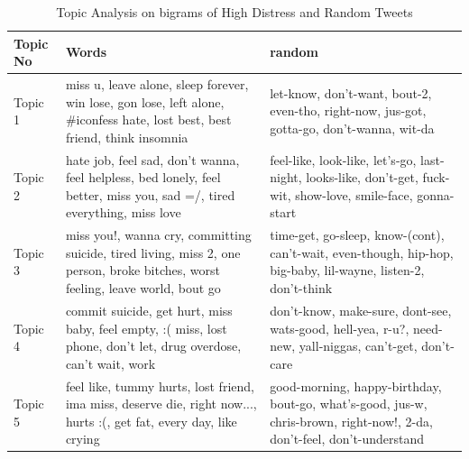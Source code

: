 \documentclass[11pt]{article}
\begin{document}
\begin{table}[h]
    \centering
    \tiny 
    \begin{tabular}{|p{0.5cm}|p{3cm}|p{3cm}|}
    \hline
    \textbf{Topic No } & \textbf{Words} & \textbf {random}  \\ \hline
    \vfill \vfill Topic 1 & miss u, leave alone, sleep forever, win lose, gon lose, left alone, \#iconfess hate, lost best, best friend, think insomnia & let-know, don't-want, bout-2, even-tho, right-now, jus-got, gotta-go, don't-wanna, wit-da\\ \hline
    \vfill \vfill Topic 2 & hate job, feel sad, don't wanna, feel helpless, bed lonely, feel better, miss you, sad =/, tired everything, miss love &  feel-like, look-like, let's-go, last-night, looks-like, don't-get, fuck-wit, show-love, smile-face, gonna-start \\ \hline
    \vfill \vfill Topic 3 & miss you!, wanna cry, committing suicide, tired living, miss 2, one person, broke bitches, worst feeling, leave world, bout go & time-get, go-sleep, know-(cont), can't-wait, even-though, hip-hop, big-baby, lil-wayne, listen-2, don't-think \\ \hline
    \vfill \vfill Topic 4 & commit suicide, get hurt, miss baby, feel empty, :( miss, lost phone, don't let, drug overdose, can't wait, \@ work & don't-know, make-sure, dont-see, wats-good, hell-yea, r-u?, need-new, yall-niggas, can't-get, don't-care\\ \hline
     \vfill \vfill Topic 5 & feel like, tummy hurts, lost friend, ima miss, deserve die, right now..., hurts :(, get fat, every day, like crying  & good-morning, happy-birthday, bout-go, what's-good, jus-w, chris-brown, right-now!, 2-da, don't-feel, don't-understand \\ \hline
    \end{tabular}
 \caption {Topic Analysis on bigrams of High Distress and Random Tweets }

\label{tab:tm}
\end{table}
\end{document}
